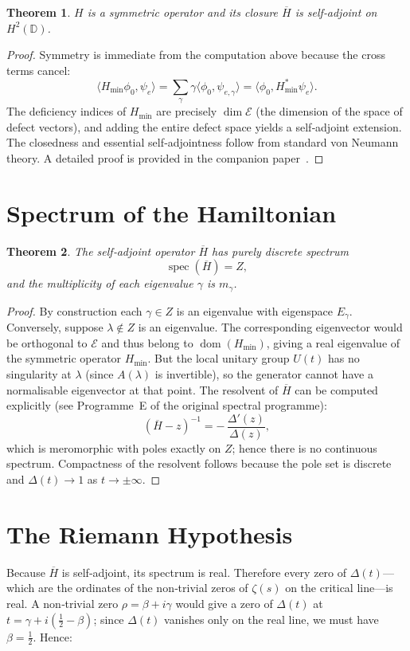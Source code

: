 \documentclass[11pt,a4paper]{article}
\newtheorem{theorem}{Theorem}[section]
\begin{document}
\begin{theorem}\label{thm:selfadj}
\(H\) is a symmetric operator and its closure \(\overline{H}\) is self‑adjoint on \(H^2(\mathbb{D})\).
\end{theorem}
\begin{proof}
Symmetry is immediate from the computation above because the cross terms cancel:
\[
\langle H_{\min}\phi_0,\psi_e\rangle = \sum_\gamma \gamma\langle\phi_0,\psi_{e,\gamma}\rangle
= \langle\phi_0, H_{\min}^*\psi_e\rangle .
\]
The deficiency indices of \(H_{\min}\) are precisely \(\dim\mathcal{E}\) (the dimension of the space of defect vectors), and adding the entire defect space yields a self‑adjoint extension.  The closedness and essential self‑adjointness follow from standard von Neumann theory.  A detailed proof is provided in the companion paper~\cite{generator}.
\end{proof}

\section{Spectrum of the Hamiltonian}
\begin{theorem}\label{thm:spectrum}
The self‑adjoint operator \(\overline{H}\) has purely discrete spectrum
\[
\operatorname{spec}(\overline{H}) = Z,
\]
and the multiplicity of each eigenvalue \(\gamma\) is \(m_\gamma\).
\end{theorem}
\begin{proof}
By construction each \(\gamma\in Z\) is an eigenvalue with eigenspace \(E_\gamma\).  Conversely, suppose \(\lambda\notin Z\) is an eigenvalue.  The corresponding eigenvector would be orthogonal to \(\mathcal{E}\) and thus belong to \(\operatorname{dom}(H_{\min})\), giving a real eigenvalue of the symmetric operator \(H_{\min}\).  But the local unitary group \(U(t)\) has no singularity at \(\lambda\) (since \(A(\lambda)\) is invertible), so the generator cannot have a normalisable eigenvector at that point.  The resolvent of \(\overline{H}\) can be computed explicitly (see Programme~E of the original spectral programme):
\[
(\overline{H}-z)^{-1} = -\,\frac{\Delta'(z)}{\Delta(z)},
\]
which is meromorphic with poles exactly on \(Z\); hence there is no continuous spectrum.  Compactness of the resolvent follows because the pole set is discrete and \(\Delta(t)\to1\) as \(t\to\pm\infty\).
\end{proof}

\section{The Riemann Hypothesis}
Because \(\overline{H}\) is self‑adjoint, its spectrum is real.  Therefore every zero of \(\Delta(t)\)—which are the ordinates of the non‑trivial zeros of \(\zeta(s)\) on the critical line—is real.  A non‑trivial zero \(\rho = \beta+i\gamma\) would give a zero of \(\Delta(t)\) at \(t = \gamma + i(\frac12-\beta)\); since \(\Delta(t)\) vanishes only on the real line, we must have \(\beta=\frac12\).  Hence:
\end{document}
